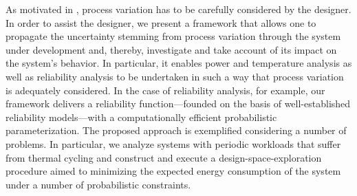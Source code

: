 As motivated in , process variation has to be carefully
considered by the designer. In order to assist the designer, we present a
framework that allows one to propagate the uncertainty stemming from process
variation through the system under development and, thereby, investigate and
take account of its impact on the system's behavior. In particular, it enables
power and temperature analysis as well as reliability analysis to be undertaken
in such a way that process variation is adequately considered. In the case of
reliability analysis, for example, our framework delivers a reliability
function---founded on the basis of well-established reliability models---with a
computationally efficient probabilistic parameterization. The proposed approach
is exemplified considering a number of problems. In particular, we analyze
systems with periodic workloads that suffer from thermal cycling and construct
and execute a design-space-exploration procedure aimed to minimizing the
expected energy consumption of the system under a number of probabilistic
constraints.
